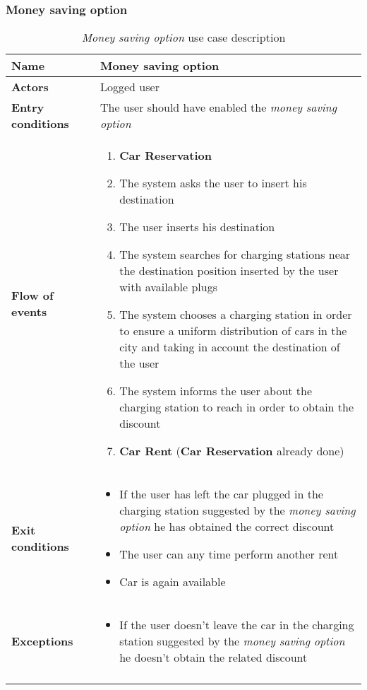 \subsubsection{Money saving option}
\begin{longtable}{p{0.25\linewidth}p{0.75\linewidth}}
\toprule
\textbf{Name} & \textbf{Money saving option} \\
\midrule
\textbf{Actors} &  Logged user\\
\midrule
\textbf{Entry conditions} & 
The user should have enabled the \emph{money saving option} \\
\midrule
\textbf{Flow of events} & 
\begin{enumerate}
	\item \textbf{Car Reservation}
	\item The system asks the user to insert his destination
	\item The user inserts his destination
	\item The system searches for charging stations near the destination position inserted by the
	user with available plugs
	\item The system chooses a charging station in order to ensure a uniform distribution of cars in
	the city and taking in account the destination of the user
	\item The system informs the user about the charging station to reach in order to obtain the discount
	\item \textbf{Car Rent} (\textbf{Car Reservation} already done)
\end{enumerate} \\
\midrule
\textbf{Exit conditions} &
\begin{itemize}
	\item If the user has left the car plugged in the charging station suggested by the
	\emph{money saving option} he has obtained the correct discount
	\item The user can any time perform another rent
	\item Car is again available
\end{itemize} \\
\midrule
\textbf{Exceptions} & 
\begin{itemize}
	\item If the user doesn't leave the car in the charging station suggested by the
	\emph{money saving option} he doesn't obtain the related discount
\end{itemize} \\
\bottomrule
\caption{\emph{Money saving option} use case description}
\end{longtable}

